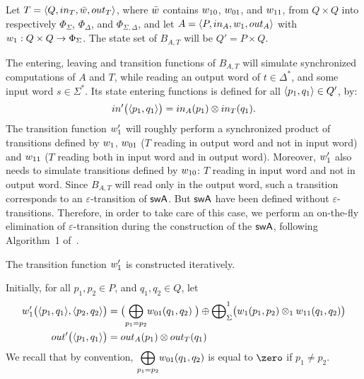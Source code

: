 %
%
Let $T = \< Q, \init_T, \bar{\wei}, \final_T >$,
where $\bar{\wei}$ contains $\wei_{10}$, $\wei_{01}$, and $\wei_{11}$,
from $Q \times Q$ into respectively
$\Phi_{\Sigma}$, $\Phi_{\Delta}$, and $\Phi_{\Sigma, \Delta}$,
and let $A = \< P, \init_A, \wei_1, \final_A >$
with $\wei_1: Q \times Q \to \Phi_{\Sigma}$.
The state set of $B_{A, T}$ will be $Q' = P \times Q$.

The entering, leaving and transition functions of $B_{A, T}$ will
simulate synchronized computations of $A$ and $T$,
while reading an output word of $t \in \Delta^*$, 
and some input word $s \in \Sigma^*$.
%
Its state entering functions is defined
for all $\<p_1, q_1> \in Q'$, %
by:
%
\begin{equation} \label{eq:initprime}
\init'\bigl(\< p_1, q_1>\bigr) = \init_A(p_1) \otimes \init_T(q_1).
\end{equation}
%
The transition function $\wei'_1$ will roughly perform
a synchronized product of transitions defined by $\wei_1$,
$\wei_{01}$ ($T$ reading in output word and not in input word)
and $\wei_{11}$ ($T$ reading both in input word and in output word).
%
Moreover, $\wei'_1$ also needs to simulate transitions
defined by $\wei_{10}$: $T$ reading in input word and not in output word.
Since $B_{A, T}$  will read only in the output word, such a transition corresponds
to an $\varepsilon$-transition of $\textsf{swA}$.
But $\textsf{swA}$ have been defined without $\varepsilon$-transitions.
Therefore, in order to take care of this case, we perform an on-the-fly
elimination of $\varepsilon$-transition during the construction of the $\textsf{swA}$,
following Algorithm~1 of~\cite{LombardySakarovitch12ciaa}.
%


\noindent
The transition function $\wei'_1$ is constructed iteratively.

\noindent
Initially, for all $p_1, p_2 \in P$, and $q_1, q_2 \in Q$, let
%
\begin{align}
\wei'_1\bigl( \< p_1, q_1>, \< p_2, q_2>\bigr) & = 
\bigl({\displaystyle\bigoplus_{p_1 = p_2}} \wei_{01}(q_1, q_2)\;\bigr)
\oplus
{\bigoplus}_\Sigma^1 \bigl(\wei_1(p_1, p_2) \otimes_1 \wei_{11}(q_1, q_2)\bigr)
\label{eq:init-wei}\\
%
\final'\bigl(\<p_1, q_1>\bigr) & =  \final_A(p_1) \otimes \final_T(q_1)
\label{eq:init-final}
\end{align}
We recall that by convention, 
${\displaystyle\bigoplus_{p_1 = p_2}} \wei_{01}(q_1, q_2)$
is equal to $\zero$ if $p_1 \neq p_2$.


